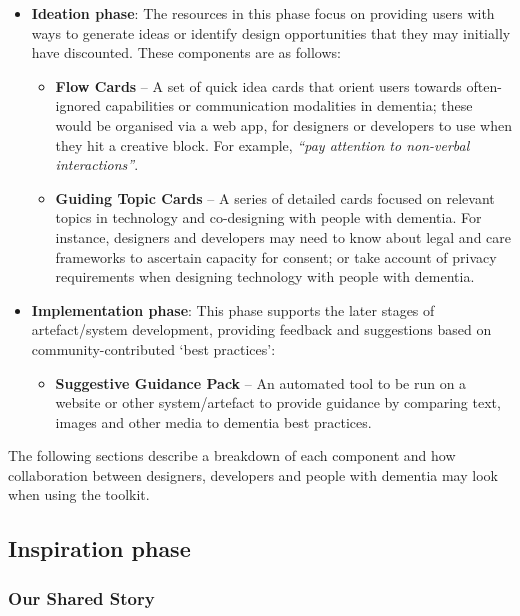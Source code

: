\begin{itemize}
    \item \textbf{Ideation phase}: The resources in this phase focus on providing users with ways to generate ideas or identify design opportunities that they may initially have discounted. These components are as follows:
    \begin{itemize}
        \item \textbf{Flow Cards} – A set of quick idea cards that orient users towards often-ignored capabilities or communication modalities in dementia; these would be organised via a web app, for designers or developers to use when they hit a creative block. For example, \textit{``pay attention to non-verbal interactions''}.
        \item \textbf{Guiding Topic Cards} – A series of detailed cards focused on relevant topics in technology and co-designing with people with dementia. For instance, designers and developers may need to know about legal and care frameworks to ascertain capacity for consent; or take account of privacy requirements when designing technology with people with dementia.
    \end{itemize}
\end{itemize}

\begin{itemize}
    \item \textbf{Implementation phase}: This phase supports the later stages of artefact/system development, providing feedback and suggestions based on community-contributed `best practices': 
    \begin{itemize}
        \item \textbf{Suggestive Guidance Pack} – An automated tool to be run on a website or other system/artefact to provide guidance by comparing text, images and other media to dementia best practices. 
    \end{itemize}
\end{itemize}

The following sections describe a breakdown of each component and how collaboration between designers, developers and people with dementia may look when using the toolkit. 

\subsection{Inspiration phase}
\subsubsection{Our Shared Story}

